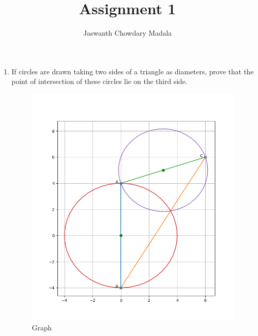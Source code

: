\documentclass[journal,12pt,twocolumn]{IEEEtran}
\begin{document}
\vspace{3cm}


\title{Assignment 1}
\author{Jaswanth Chowdary Madala}





\maketitle

\newpage


\bigskip

\renewcommand{\thefigure}{\theenumi}
\renewcommand{\thetable}{\theenumi}


\begin{enumerate}
\item If circles are drawn taking two sides of a triangle as diameters, prove that the point of intersection of these circles lie on the third side.
\begin{figure}[ht]
\centering
\includegraphics[width = \columnwidth]{figs/fig.png}
\caption{Graph}
\label{fig:1}
\end{figure}


\end{enumerate}
\end{document}
